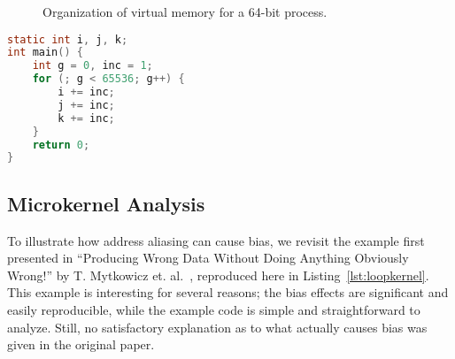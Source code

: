 \documentclass[prodmode,acmtaco]{acmsmall}
\begin{document}
\begin{figure}[h]
  \centering
  \caption{Organization of virtual memory for a 64-bit process.}
  \label{fig:virtualmemory}
\end{figure}

\begin{lstlisting}[float=h, language=C, caption={Micro-kernel succeptible to bias from variations to system environment variables.}, label={lst:loopkernel}, frame=lines]
static int i, j, k;
int main() {
    int g = 0, inc = 1;
    for (; g < 65536; g++) {
        i += inc;
        j += inc;
        k += inc; 
    }
    return 0;
}
\end{lstlisting}

\subsection{Microkernel Analysis}
To illustrate how address aliasing can cause bias, we revisit the example first presented in ``Producing Wrong Data Without Doing Anything Obviously Wrong!'' by T. Mytkowicz et. al.~\cite{Mytkowicz:2009:WrongData}, reproduced here in Listing~\ref{lst:loopkernel}. 
This example is interesting for several reasons; the bias effects are significant and easily reproducible, while the example code is simple and straightforward to analyze.
Still, no satisfactory explanation as to what actually causes bias was given in the original paper.
\end{document}
